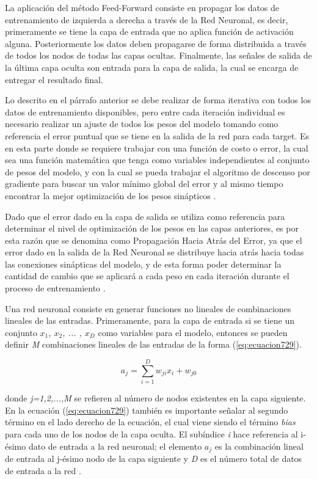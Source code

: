 {La aplicación del método Feed-Forward consiste en propagar los datos de entrenamiento de izquierda a derecha a través de la Red Neuronal, es decir, primeramente se tiene la capa de entrada que no aplica función de activación 
alguna. Posteriormente los datos deben propagarse de forma distribuida a través de todos los nodos de todas las capas ocultas. Finalmente,
las señales de salida de la última capa oculta son entrada para la capa de salida, la cual se encarga de entregar el resultado final.

Lo descrito en el párrafo anterior se debe realizar de forma iterativa con todos los datos de entrenamiento disponibles, pero entre cada iteración individual es necesario realizar un ajuste de todos los pesos del modelo tomando 
como referencia el error puntual que se tiene en la salida de la red para cada target. Es en esta parte donde se requiere trabajar con una función de costo o error, la cual sea una función 
matemática que tenga como variables independientes al conjunto de pesos del modelo, y con la cual se pueda trabajar el algoritmo de descenso por gradiente para buscar un valor mínimo global del error y al mismo tiempo encontrar 
la mejor optimización de los pesos sinápticos \cite{BobadillaML}. 

Dado que el error dado en la capa de salida se utiliza como referencia para determinar el nivel de optimización de los pesos en las capas anteriores, es por esta razón que se 
denomina como Propagación Hacia Atrás del Error, ya que el error dado en la salida de la Red Neuronal se distribuye hacia atrás hacia todas las conexiones sinápticas del modelo, y de esta forma poder determinar la 
cantidad de cambio que se aplicará a cada peso en cada iteración durante el proceso de entrenamiento \cite{BobadillaML}.

Una red neuronal consiste en generar funciones no lineales de combinaciones lineales de las entradas. Primeramente, para la capa de entrada si se tiene un conjunto \textit{$x_1$, $x_2$, ... , $x_D$} como variables para el 
modelo, entonces se pueden definir \textit{M} combinaciones lineales de las entradas de la forma (\ref{eq:ecuacion729}).

\begin{equation}
	a_j=\sum_{i=1}^{D} {w_{ji} x_i + w_{j0}}
	\label{eq:ecuacion729}
\end{equation}

donde \textit{j=1,2,...,M} se refieren al número de nodos existentes en la capa siguiente. En la ecuación (\ref{eq:ecuacion729}) también es importante señalar al segundo término en el lado derecho de la ecuación, el cual viene siendo 
el término \textit{bias} para cada uno de los nodos de la capa oculta. El subíndice \textit{i} hace referencia al i-ésimo dato de entrada a la red neuronal; el elemento \textit{$a_j$} es la combinación lineal de entrada 
al j-ésimo nodo de la capa siguiente y \textit{D} es el número total de datos de entrada a la red \cite{bishop}. 

}
